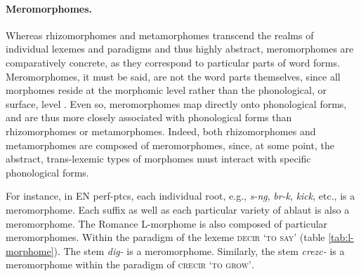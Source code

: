 \paragraph{Meromorphomes.} Whereas rhizomorphomes and metamorphomes 
transcend the realms of individual lexemes and paradigms and thus highly 
abstract, meromorphomes are comparatively concrete, as they 
correspond to particular parts of word forms. Meromorphomes, it must be said, 
are not the word parts themselves, since all morphomes reside at the 
morphomic level rather than the phonological, or surface, level \citep{round:2011}. 
Even so, meromorphomes map directly onto phonological forms, and 
are thus more closely associated with phonological forms than rhizomorphomes 
or metamorphomes. Indeed, both rhizomorphomes and metamorphomes are 
composed of meromorphomes, since, at some point, the abstract, trans-lexemic 
types of morphomes must interact with specific phonological forms. 

For instance, in \ac{EN} \ac{perf-ptc}s, each individual root, e.g., \textit{s-ng}, 
\textit{br-k}, \textit{kick}, etc., is a meromorphome. Each suffix 
as well as each particular variety of ablaut is also a meromorphome. 
The Romance L-morphome is also composed of particular meromorphomes. 
Within the paradigm of the lexeme \textsc{decir} \textsc{`to say'} 
(table \ref{tab:l-morphome}). The stem \textit{dig-} is a meromorphome. 
Similarly, the stem \textit{crezc-} is a meromorphome within the paradigm of 
\textsc{crecir} \textsc{`to grow'}.

\begin{table}[ht]
\begin{center}
\label{tab:fusion}
\caption{Fusional suffixes in Hebrew nominals}
\end{center}
\end{table}

